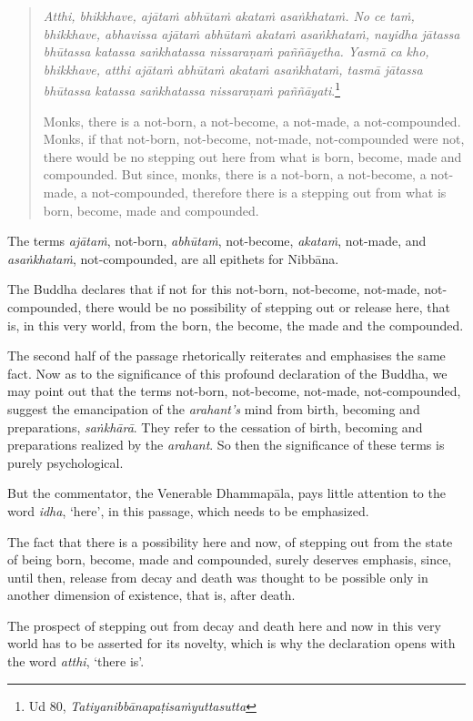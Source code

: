 \begin{quote}
\emph{Atthi, bhikkhave, ajātaṁ abhūtaṁ akataṁ asaṅkhataṁ. No ce taṁ, bhikkhave, abhavissa ajātaṁ abhūtaṁ akataṁ asaṅkhataṁ, nayidha jātassa bhūtassa katassa saṅkhatassa nissaraṇaṁ paññāyetha. Yasmā ca kho, bhikkhave, atthi ajātaṁ abhūtaṁ akataṁ asaṅkhataṁ, tasmā jātassa bhūtassa katassa saṅkhatassa nissaraṇaṁ paññāyati}.\footnote{Ud 80, \emph{Tatiyanibbānapaṭisaṁyuttasutta}}

Monks, there is a not-born, a not-become, a not-made, a not-compounded. Monks, if that not-born, not-become, not-made, not-compounded were not, there would be no stepping out here from what is born, become, made and compounded. But since, monks, there is a not-born, a not-become, a not-made, a not-compounded, therefore there is a stepping out from what is born, become, made and compounded.
\end{quote}

The terms \emph{ajātaṁ}, not-born, \emph{abhūtaṁ}, not-become, \emph{akataṁ}, not-made, and \emph{asaṅkhataṁ}, not-compounded, are all epithets for Nibbāna.

The Buddha declares that if not for this not-born, not-become, not-made, not-compounded, there would be no possibility of stepping out or release here, that is, in this very world, from the born, the become, the made and the compounded.

The second half of the passage rhetorically reiterates and emphasises the same fact. Now as to the significance of this profound declaration of the Buddha, we may point out that the terms not-born, not-become, not-made, not-compounded, suggest the emancipation of the \emph{arahant's} mind from birth, becoming and preparations, \emph{saṅkhārā}. They refer to the cessation of birth, becoming and preparations realized by the \emph{arahant}. So then the significance of these terms is purely psychological.

But the commentator, the Venerable Dhammapāla, pays little attention to the word \emph{idha}, `here', in this passage, which needs to be emphasized.

The fact that there is a possibility here and now, of stepping out from the state of being born, become, made and compounded, surely deserves emphasis, since, until then, release from decay and death was thought to be possible only in another dimension of existence, that is, after death.

The prospect of stepping out from decay and death here and now in this very world has to be asserted for its novelty, which is why the declaration opens with the word \emph{atthi}, `there is'.


